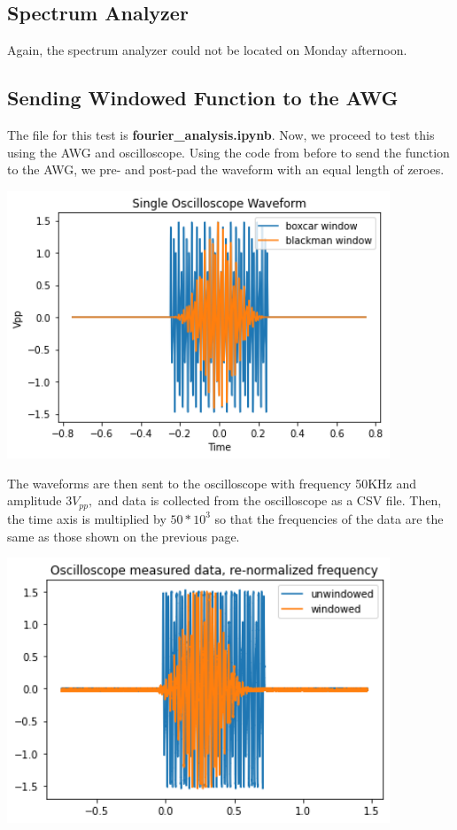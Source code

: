 \documentclass{article}
\begin{document}
    \subsection*{Spectrum Analyzer}
    Again, the spectrum analyzer could not be located on Monday afternoon.
    \subsection*{Sending Windowed Function to the AWG}
    The file for this test is \textbf{fourier\_analysis.ipynb}. Now, we proceed to test this using the AWG and oscilloscope. Using the code from before to send the function to the AWG, we pre- and post-pad the waveform with an equal length of zeroes.
    \begin{mdframed}[backgroundcolor=gray!20, align = center, userdefinedwidth = 4.8in]
    \includegraphics[width = 4.5in]{img/oscilloscope waveform.png}
    \end{mdframed}
    The waveforms are then sent to the oscilloscope with frequency 50KHz and amplitude $3V_{pp},$ and data is collected from the oscilloscope as a CSV file. Then, the time axis is multiplied by $50*10^3$ so that the frequencies of the data are the same as those shown on the previous page.
    \begin{mdframed}[backgroundcolor=gray!20, align = center, userdefinedwidth = 4.8in]
    \includegraphics[width = 4.5in]{img/oscilloscopeOut.png}
    \end{mdframed}
\end{document}
